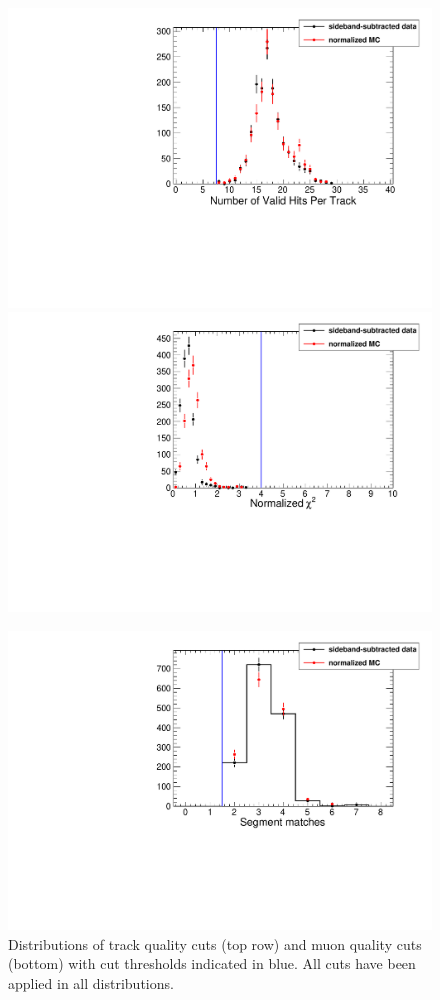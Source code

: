 \documentclass[12pt]{article}
\begin{document}
\begin{figure}
\begin{center}
\includegraphics[width=0.48\linewidth]{phi_hits.pdf}
\includegraphics[width=0.48\linewidth]{phi_normchi2.pdf}

\vspace{0.25 cm}
\includegraphics[width=0.48\linewidth]{phi_matches.pdf}
\end{center}

\caption{Distributions of track quality cuts (top row) and muon
  quality cuts (bottom) with cut thresholds indicated in blue.  All
  cuts have been applied in all distributions. \label{fig:phi_cuts}}
\end{figure}
\end{document}
